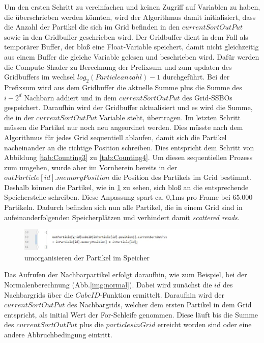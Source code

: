 \documentclass[intern,palatino]{cgBA}
\begin{document}
Um den ersten Schritt zu vereinfachen und keinen Zugriff auf Variablen zu haben, die überschrieben werden könnten, wird der Algorithmus damit initialisiert, dass die Anzahl der Partikel die sich im Grid befinden in den $currentSortOutPut$ sowie in den Gridbuffer geschrieben wird.
\newline
Der Gridbuffer dient in dem Fall als temporärer Buffer, der bloß eine Float-Variable speichert, damit nicht gleichzeitig aus einem Buffer die gleiche Variable gelesen und beschrieben wird.
Dafür werden die Compute-Shader zu Berechnung der Prefixsum und zum updaten des Gridbuffers im wechsel $log_2(Particleanzahl)-1$ durchgeführt. Bei der Prefixsum wird aus dem Gridbuffer die aktuelle Summe plus die Summe des $i - 2^d$ Nachbarn addiert und in dem $currentSortOutPut$ des Grid-SSBOs gespeichert. Daraufhin wird der Gridbuffer aktualisiert und es wird die Summe, die in der $currentSortOutPut$ Variable steht, übertragen.
\newline
Im letzten Schritt müssen die Partikel nur noch neu angeordnet werden. Dies müsste nach dem Algorithmus für jedes Grid sequentiell ablaufen, damit sich die Partikel nacheinander an die richtige Position schreiben. Dies entspricht dem Schritt von Abbildung \ref{tab:Counting3} zu \ref{tab:Counting4}.
\newline
Um diesen sequentiellen Prozess zum umgehen, wurde aber im Vornherein bereits in der $outParticle[id].memoryPosition$ die Position des Partikels im Grid bestimmt. Deshalb können die Partikel, wie in \ref{img:rearrange} zu sehen, sich bloß an die entsprechende Speicherstelle schreiben. Diese Anpassung spart ca. 0,1ms pro Frame bei 65.000 Partikeln. Dadurch befinden sich nun alle Partikel, die in einem Grid sind in aufeinanderfolgenden Speicherplätzen und verhindert damit \textit{scattered reads}.

\begin{figure}[H]
	\centering
	\includegraphics[width=1.3\columnwidth]{Bilder/rearrange.jpg}
	\caption{umorganisieren der Partikel im Speicher}
	\label{img:rearrange}
\end{figure}

Das Aufrufen der Nachbarpartikel erfolgt daraufhin, wie zum Beispiel, bei der Normalenberechnung (Abb.\ref{img:normal}). Dabei wird zunächst die $id$ des Nachbargrids über die $CubeID$-Funktion ermittelt. Daraufhin wird der $currentSortOutPut$ des Nachbargrids, welcher dem ersten Partikel in dem Grid entspricht, als initial Wert der For-Schleife genommen. Diese läuft bis die Summe des $currentSortOutPut$ plus die $particlesinGrid$ erreicht worden sind oder eine andere Abbruchbedingung eintritt.
\end{document}

